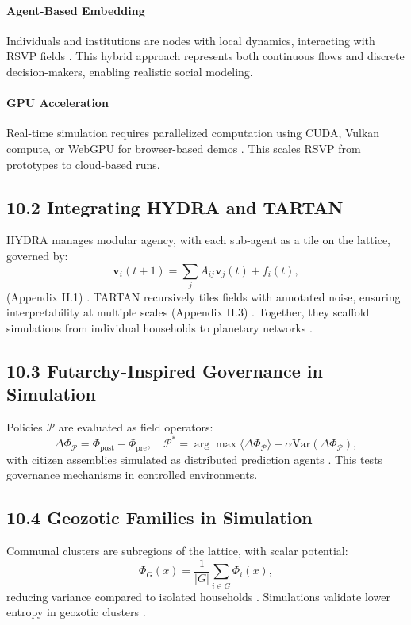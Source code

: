 \documentclass[12pt]{article}
\begin{document}
\paragraph{Agent-Based Embedding}
Individuals and institutions are nodes with local dynamics, interacting with RSVP fields \citep{pearl2009}. This hybrid approach represents both continuous flows and discrete decision-makers, enabling realistic social modeling.
\paragraph{GPU Acceleration}
Real-time simulation requires parallelized computation using CUDA, Vulkan compute, or WebGPU for browser-based demos \citep{bird1988}. This scales RSVP from prototypes to cloud-based runs.

\subsection*{10.2 Integrating HYDRA and TARTAN}
HYDRA manages modular agency, with each sub-agent as a tile on the lattice, governed by:
\[
\mathbf{v}_i(t+1) = \sum_j A_{ij} \mathbf{v}_j(t) + f_i(t),
\]
(Appendix H.1) \citep{bird1988}. TARTAN recursively tiles fields with annotated noise, ensuring interpretability at multiple scales (Appendix H.3) \citep{milewski2018}. Together, they scaffold simulations from individual households to planetary networks \citep{friston2010}.

\subsection*{10.3 Futarchy-Inspired Governance in Simulation}
Policies \(\mathcal{P}\) are evaluated as field operators:
\[
\Delta \Phi_{\mathcal{P}} = \Phi_{\text{post}} - \Phi_{\text{pre}}, \quad \mathcal{P}^* = \arg \max \langle \Delta \Phi_{\mathcal{P}} \rangle - \alpha \mathrm{Var}(\Delta \Phi_{\mathcal{P}}),
\]
with citizen assemblies simulated as distributed prediction agents \citep{hanson2003}. This tests governance mechanisms in controlled environments.

\subsection*{10.4 Geozotic Families in Simulation}
Communal clusters are subregions of the lattice, with scalar potential:
\[
\Phi_G(x) = \frac{1}{|G|} \sum_{i \in G} \Phi_i(x),
\]
reducing variance compared to isolated households \citep{cover2006}. Simulations validate lower entropy in geozotic clusters \citep{deleuze1987}.
\end{document}
